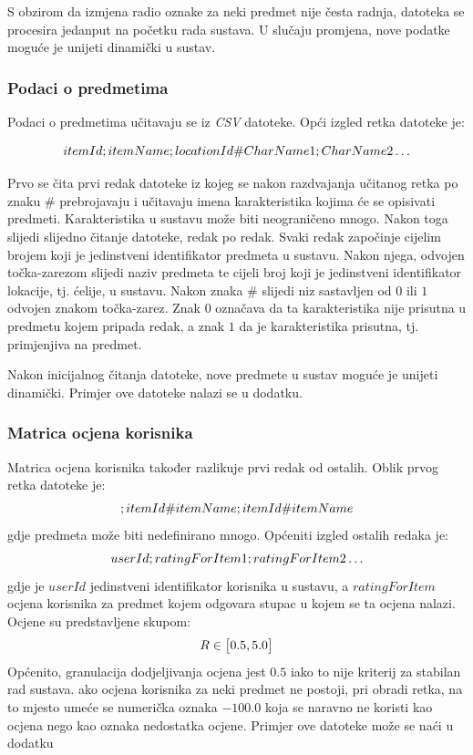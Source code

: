 \documentclass[times, utf8, diplomski, numeric]{fer}
\begin{document}
S obzirom da izmjena radio oznake za neki predmet nije česta radnja, datoteka se
procesira jedanput na početku rada sustava. U slučaju promjena, nove podatke
moguće je unijeti dinamički u sustav.

\subsubsection{Podaci o predmetima}
Podaci o predmetima učitavaju se iz \emph{CSV} datoteke. Opći izgled retka
datoteke je:

\begin{equation}
	\centering
	itemId;itemName;locationId\#CharName1;CharName2 \ldots
\end{equation}

Prvo se čita prvi redak datoteke iz kojeg se nakon razdvajanja učitanog retka po
znaku $\#$ prebrojavaju i učitavaju imena karakteristika kojima će se opisivati
predmeti. Karakteristika u sustavu može biti neograničeno mnogo. Nakon toga
slijedi slijedno čitanje datoteke, redak po redak. Svaki redak započinje
cijelim brojem koji je jedinstveni identifikator predmeta u sustavu. Nakon
njega, odvojen točka-zarezom slijedi naziv predmeta te cijeli broj koji je
jedinstveni identifikator lokacije, tj. ćelije, u sustavu. Nakon
znaka $\#$ slijedi niz sastavljen od $0$ ili $1$ odvojen znakom točka-zarez.
Znak $0$ označava da ta karakteristika nije prisutna u predmetu kojem pripada
redak, a znak $1$ da je karakteristika prisutna, tj. primjenjiva na predmet.

Nakon inicijalnog čitanja datoteke, nove predmete u sustav moguće je unijeti
dinamički. Primjer ove datoteke nalazi se u dodatku.

\subsubsection{Matrica ocjena korisnika}
Matrica ocjena korisnika također razlikuje prvi redak od ostalih. 
Oblik prvog retka datoteke je:
\begin{equation}
	\centering
	;itemId\#itemName;itemId\#itemName
\end{equation}
gdje predmeta može biti nedefinirano mnogo. Općeniti izgled ostalih redaka je:
\begin{equation}
	\centering
	userId;ratingForItem1;ratingForItem2 \ldots
\end{equation}
gdje je $userId$ jedinstveni identifikator korisnika u sustavu, a
$ratingForItem$ ocjena korisnika za predmet kojem odgovara stupac u kojem se ta
ocjena nalazi. Ocjene su predstavljene skupom:
\begin{equation}
	\centering
	R \in \big[ 0.5, 5.0 \big]
\end{equation}
Općenito, granulacija dodjeljivanja ocjena jest $0.5$ iako to nije kriterij za
stabilan rad sustava. ako ocjena korisnika za neki predmet ne postoji, pri
obradi retka, na to mjesto umeće se numerička oznaka $-100.0$ koja se naravno
ne koristi kao ocjena nego kao oznaka nedostatka ocjene. Primjer ove datoteke
može se naći u dodatku
\end{document}

